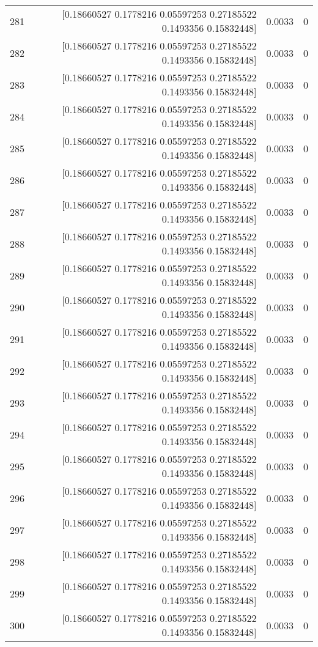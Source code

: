 \begin{longtable}{lrrr}
281 & [0.18660527 0.1778216  0.05597253 0.27185522 0.1493356  0.15832448] & 0.0033 & 0 \\
282 & [0.18660527 0.1778216  0.05597253 0.27185522 0.1493356  0.15832448] & 0.0033 & 0 \\
283 & [0.18660527 0.1778216  0.05597253 0.27185522 0.1493356  0.15832448] & 0.0033 & 0 \\
284 & [0.18660527 0.1778216  0.05597253 0.27185522 0.1493356  0.15832448] & 0.0033 & 0 \\
285 & [0.18660527 0.1778216  0.05597253 0.27185522 0.1493356  0.15832448] & 0.0033 & 0 \\
286 & [0.18660527 0.1778216  0.05597253 0.27185522 0.1493356  0.15832448] & 0.0033 & 0 \\
287 & [0.18660527 0.1778216  0.05597253 0.27185522 0.1493356  0.15832448] & 0.0033 & 0 \\
288 & [0.18660527 0.1778216  0.05597253 0.27185522 0.1493356  0.15832448] & 0.0033 & 0 \\
289 & [0.18660527 0.1778216  0.05597253 0.27185522 0.1493356  0.15832448] & 0.0033 & 0 \\
290 & [0.18660527 0.1778216  0.05597253 0.27185522 0.1493356  0.15832448] & 0.0033 & 0 \\
291 & [0.18660527 0.1778216  0.05597253 0.27185522 0.1493356  0.15832448] & 0.0033 & 0 \\
292 & [0.18660527 0.1778216  0.05597253 0.27185522 0.1493356  0.15832448] & 0.0033 & 0 \\
293 & [0.18660527 0.1778216  0.05597253 0.27185522 0.1493356  0.15832448] & 0.0033 & 0 \\
294 & [0.18660527 0.1778216  0.05597253 0.27185522 0.1493356  0.15832448] & 0.0033 & 0 \\
295 & [0.18660527 0.1778216  0.05597253 0.27185522 0.1493356  0.15832448] & 0.0033 & 0 \\
296 & [0.18660527 0.1778216  0.05597253 0.27185522 0.1493356  0.15832448] & 0.0033 & 0 \\
297 & [0.18660527 0.1778216  0.05597253 0.27185522 0.1493356  0.15832448] & 0.0033 & 0 \\
298 & [0.18660527 0.1778216  0.05597253 0.27185522 0.1493356  0.15832448] & 0.0033 & 0 \\
299 & [0.18660527 0.1778216  0.05597253 0.27185522 0.1493356  0.15832448] & 0.0033 & 0 \\
300 & [0.18660527 0.1778216  0.05597253 0.27185522 0.1493356  0.15832448] & 0.0033 & 0 \\

\end{longtable}

